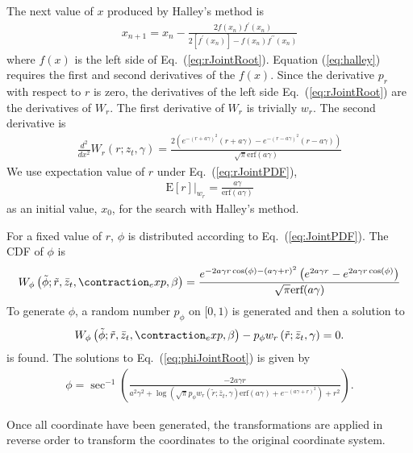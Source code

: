 \documentclass{revtex4}
\begin{document}
  The next value of $x$ produced by Halley's method is
  \begin{align}
    x_{n+1} = x_n - \frac{2 f(x_n) f^\prime(x_n)}{2[f^\prime(x_n)] - f(x_n) f^{\prime\prime}(x_n)}
    \label{eq:halley}
  \end{align}
  where $f(x)$ is the left side of Eq.\ (\ref{eq:rJointRoot}).
  Equation (\ref{eq:halley}) requires the first and second derivatives of the $f(x)$. Since the derivative $p_r$ with respect to $r$ is zero, the derivatives of the left side Eq.\
  (\ref{eq:rJointRoot}) are the derivatives of $W_r$. The first derivative of $W_r$ is trivially $w_r$. The second derivative is
  \begin{align}
   \frac{d^2}{dx^2} W_r(r; z_t, \gamma)  = 
   \frac{2 \left(e^{-(r+a \gamma)^2} (r+a \gamma) - e^{-(r-a \gamma )^2} (r-a \gamma)\right)}{\sqrt{\pi } \text{erf}(a \gamma )}
  \end{align}
  We use expectation value of $r$ under Eq.\ (\ref{eq:rJointPDF}),
  \begin{align}
    \mathrm{E}[r]|_{w_r} = \frac{a \gamma }{\text{erf}(a \gamma )}
  \end{align}
  as an initial value, $x_0$, for the search with Halley's method.

  For a fixed value of $r$, $\phi$ is distributed according to Eq.\ (\ref{eq:JointPDF}). The CDF of $\phi$ is
  \begin{align}
    W_\phi\left(\tilde{\phi} ; \tilde{r}, \bar{z}_t, \contraction_exp, \beta\right) =
    \frac{e^{-2 a \gamma  r \cos (\phi )-(a \gamma +r)^2} \left(e^{2 a \gamma  r}-e^{2 a \gamma  r \cos (\phi )}\right)}{\sqrt{\pi } \text{erf}(a \gamma )}
  \end{align}
  To generate $\phi$, a random number $p_\phi$ on $[0, 1)$ is generated and then a solution to 
  \begin{align}
    W_\phi\left(\tilde{\phi} ; \tilde{r}, \bar{z}_t, \contraction_exp, \beta\right) - p_\phi w_r\left(\tilde{r}; \bar{z}_t, \gamma \right) = 0.
    \label{eq:phiJointRoot}
  \end{align}
  is found.
  The solutions to Eq.\ (\ref{eq:phiJointRoot}) is given by
  \begin{align}
    \phi = 
    \sec ^{-1}\left(\frac{-2 a \gamma  r}{a^2 \gamma ^2+\log \left(\sqrt{\pi } p_\phi w_r\left(\tilde{r}; \bar{z}_t, \gamma \right) \text{erf}(a \gamma )+e^{-(a \gamma +r)^2}\right)+r^2}\right).
  \end{align}

  Once all coordinate have been generated, the transformations are applied in reverse order to transform the coordinates to the original coordinate system.
\end{document}
